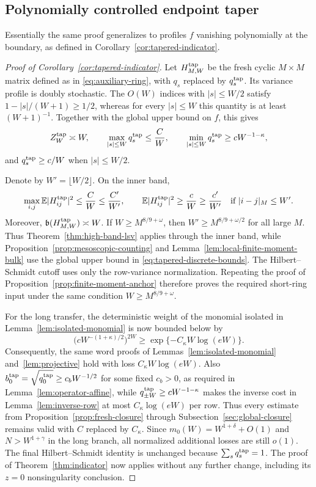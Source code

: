 \documentclass[11pt,reqno]{amsart}
\numberwithin{equation}{section}
\theoremstyle{definition}
\theoremstyle{remark}
\newcommand{\E}{\mathbb E}
\newcommand{\1}{\mathbf 1}
\begin{document}
\subsection{Polynomially controlled endpoint taper}
Essentially the same proof generalizes to profiles $f$ vanishing polynomially at the boundary, as defined in Corollary~\ref{cor:tapered-indicator}.
\begin{proof}[Proof of Corollary~\ref{cor:tapered-indicator}]
Let $H^{\rm tap}_{M,W}$ be the fresh cyclic $M\times M$ matrix defined as
in \eqref{eq:auxiliary-ring}, with $q_s$ replaced by $q_s^{\rm tap}$.
Its variance profile is doubly stochastic.  The $O(W)$ indices with
$|s|\le W/2$ satisfy
$1-|s|/(W+1)\ge1/2$, whereas for every $|s|\le W$ this quantity is at least
$(W+1)^{-1}$.  Together with the global upper bound on $f$, this gives
\begin{equation}\label{eq:tapered-discrete-bounds}
 Z_W^{\rm tap}\asymp W,\qquad
 \max_{|s|\le W}q_s^{\rm tap}\le\frac CW,\qquad
 \min_{|s|\le W}q_s^{\rm tap}\ge cW^{-1-\kappa},
\end{equation}
and $q_s^{\rm tap}\ge c/W$ when $|s|\le W/2$.

Denote by $W'=\lfloor W/2\rfloor$.  On the inner band,
\[
 \max_{i,j}\E|H^{\rm tap}_{ij}|^2\le\frac CW\le\frac{C'}{W'},
 \qquad
 \E|H^{\rm tap}_{ij}|^2\ge\frac cW\ge\frac{c'}{W'}
 \quad\text{if }|i-j|_M\le W'.
\]
Moreover, $\mathfrak b(H^{\rm tap}_{M,W})\asymp W$.  If
$W\ge M^{8/9+\omega}$, then
$W'\ge M^{8/9+\omega/2}$ for all large $M$.  Thus
Theorem~\ref{thm:high-band-lsv} applies through the inner band, while
Proposition~\ref{prop:mesoscopic-counting} and
Lemma~\ref{lem:local-finite-moment-bulk} use the global upper bound in
\eqref{eq:tapered-discrete-bounds}.  The Hilbert--Schmidt cutoff uses only
the row-variance normalization.  Repeating the proof of
Proposition~\ref{prop:finite-moment-anchor} therefore proves the required
short-ring input under the same condition $W\ge M^{8/9+\omega}$.

For the long transfer, the deterministic weight of the monomial isolated
in Lemma~\ref{lem:isolated-monomial} is now bounded below by
\[
 \big(cW^{-(1+\kappa)/2}\big)^{2W}
 \ge \exp\{-C_\kappa W\log(eW)\}.
\]
Consequently, the same word proofs of
Lemmas~\ref{lem:isolated-monomial} and~\ref{lem:projective} hold with loss
$C_\kappa W\log(eW)$.  Also
$b_0^{\rm tap}=\sqrt{q_0^{\rm tap}}\ge c_bW^{-1/2}$ for some fixed
$c_b>0$, as required in Lemma~\ref{lem:operator-affine}, while
$q_{\pm W}^{\rm tap}\ge cW^{-1-\kappa}$ makes the inverse cost in
Lemma~\ref{lem:inverse-row} at most $C_\kappa\log(eW)$ per row.  Thus every
estimate from
Proposition~\ref{prop:fresh-closure} through
Subsection~\ref{sec:global-closure} remains valid with $C$ replaced by
$C_\kappa$.  Since $m_0(W)=W^{1+\delta}+O(1)$ and
$N>W^{1+\gamma}$ in the long branch, all normalized additional losses are
still $o(1)$.  The final Hilbert--Schmidt identity is unchanged because
\(\sum_s q_s^{\rm tap}=1\).  The proof of
Theorem~\ref{thm:indicator} now
applies without any further change, including its \(z=0\)
nonsingularity conclusion.
\end{proof}
\end{document}
